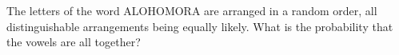 The letters of the word ALOHOMORA are arranged in a random order, all distinguishable arrangements being equally likely. What is the probability that the vowels are all together?
